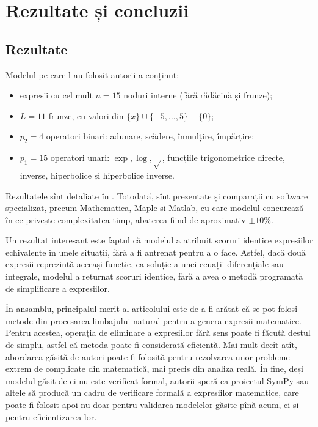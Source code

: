
\chapter{Rezultate și concluzii}

\section{Rezultate}

Modelul pe care l-au folosit autorii a conținut:
\begin{itemize}
    \item expresii cu cel mult $ n = 15 $ noduri interne (fără rădăcină
        și frunze);
    \item $ L = 11 $ frunze, cu valori din $ \{ x \} \cup \{-5, \dots, 5 \} - \{0\} $;
    \item $ p_2 = 4 $ operatori binari: adunare, scădere, înmulțire, împărțire;
    \item $ p_1 = 15 $ operatori unari: $ \exp, \log, \sqrt{} $, funcțiile trigonometrice
        directe, inverse, hiperbolice și hiperbolice inverse.
\end{itemize}

Rezultatele sînt detaliate în \cite[\S4]{lample2019deep}. Totodată, sînt
prezentate și comparații cu software specializat, precum Mathematica, Maple
și Matlab, cu care modelul concurează în ce privește complexitatea-timp,
abaterea fiind de aproximativ $ \pm 10\% $.

Un rezultat interesant este faptul că modelul a atribuit scoruri identice
expresiilor echivalente în unele situații, fără a fi antrenat pentru a o face.
Astfel, dacă două expresii reprezintă aceeași funcție, ca soluție a unei ecuații
diferențiale sau integrale, modelul a returnat scoruri identice, fără a avea o
metodă programată de simplificare a expresiilor.

\vspace{0.5cm}

În ansamblu, principalul merit al articolului este de a fi arătat că se pot folosi
metode din procesarea limbajului natural pentru a genera expresii matematice. Pentru
acestea, operația de eliminare a expresiilor fără sens poate fi făcută destul de
simplu, astfel că metoda poate fi considerată eficientă. Mai mult decît atît,
abordarea găsită de autori poate fi folosită pentru rezolvarea unor probleme
extrem de complicate din matematică, mai precis din analiza reală. În fine,
deși modelul găsit de ei nu este verificat formal, autorii speră ca proiectul
SymPy sau altele să producă un cadru de verificare formală a expresiilor
matematice, care poate fi folosit apoi nu doar pentru validarea modelelor
găsite pînă acum, ci și pentru eficientizarea lor.

